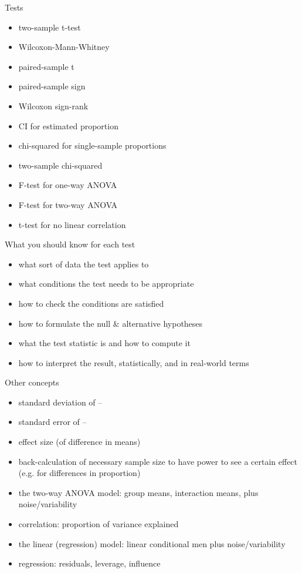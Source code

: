 \begin{frame}{Tests}

  \begin{itemize}
    \item two-sample t-test
    \item Wilcoxon-Mann-Whitney
    \item paired-sample t
    \item paired-sample sign
    \item Wilcoxon sign-rank
    \item CI for estimated proportion
    \item chi-squared for single-sample proportions
    \item two-sample chi-squared
    \item F-test for one-way ANOVA
    \item F-test for two-way ANOVA
    \item t-test for no linear correlation
  \end{itemize}

\end{frame}

\begin{frame}{What you should know for each test}

  \begin{itemize}
    \item what sort of data the test applies to
    \item what conditions the test needs to be appropriate
    \item how to check the conditions are satisfied
    \item how to formulate the null \& alternative hypotheses
    \item what the test statistic is and how to compute it
    \item how to interpret the result, statistically, and in real-world terms
  \end{itemize}


\end{frame}

\begin{frame}{Other concepts}
  
  \begin{itemize}
    \item standard deviation of --
    \item standard error of --
    \item effect size (of difference in means)
    \item back-calculation of necessary sample size to have power to see a certain effect (e.g. for differences in proportion)
    \item the two-way ANOVA model: group means, interaction means, plus noise/variability
    \item correlation: proportion of variance explained
    \item the linear (regression) model: linear conditional men plus noise/variability
    \item regression: residuals, leverage, influence
  \end{itemize}


\end{frame}

